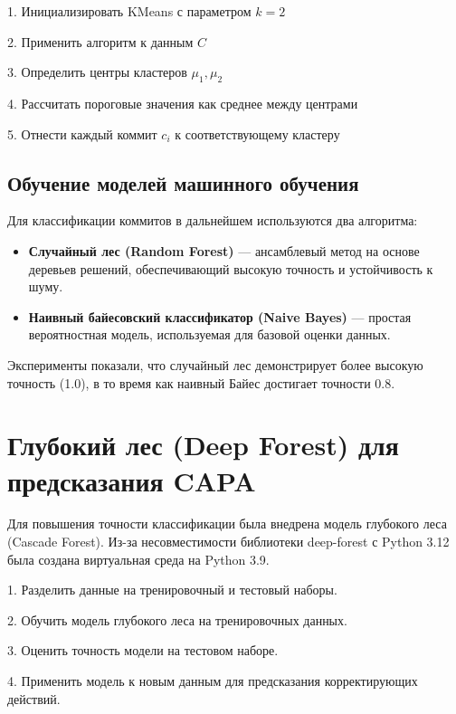 \begin{algorithm}
	\SetAlgoLined
	1. Инициализировать KMeans с параметром \( k=2 \)
	
	2. Применить алгоритм к данным \( C \)
	
	3. Определить центры кластеров \( \mu_1, \mu_2 \)
	
	4. Рассчитать пороговые значения как среднее между центрами
	
	5. Отнести каждый коммит \( c_i \) к соответствующему кластеру
	
\end{algorithm}

\subsection{Обучение моделей машинного обучения}

Для классификации коммитов в дальнейшем используются два алгоритма:

\begin{itemize}
	\item \textbf{Случайный лес (Random Forest)} --- ансамблевый метод на основе деревьев решений, обеспечивающий высокую точность и устойчивость к шуму.
	\item \textbf{Наивный байесовский классификатор (Naive Bayes)} --- простая вероятностная модель, используемая для базовой оценки данных.
\end{itemize}

Эксперименты показали, что случайный лес демонстрирует более высокую точность (1.0), в то время как наивный Байес достигает точности 0.8.

\section{Глубокий лес (Deep Forest) для предсказания CAPA} \label{ch2:deep_forest}

Для повышения точности классификации была внедрена модель глубокого леса (Cascade Forest). Из-за несовместимости библиотеки deep-forest с Python 3.12 была создана виртуальная среда на Python 3.9.

\begin{algorithm}
	\SetAlgoLined
	1. Разделить данные на тренировочный и тестовый наборы.
	
	2. Обучить модель глубокого леса на тренировочных данных.
	
	3. Оценить точность модели на тестовом наборе.
	
	4. Применить модель к новым данным для предсказания корректирующих действий.
	
\end{algorithm}

